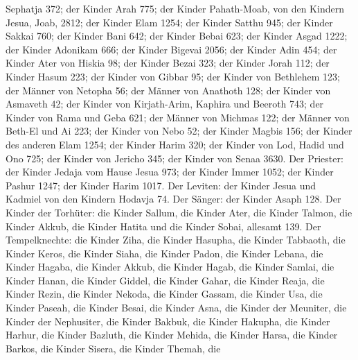 Sephatja 372;  der Kinder Arah 775;  der Kinder
Pahath-Moab, von den Kindern Jesua, Joab, 2812;  der Kinder
Elam 1254;  der Kinder Satthu 945;  der Kinder
Sakkai 760;  der Kinder Bani 642;  der Kinder
Bebai 623;  der Kinder Asgad 1222;  der Kinder
Adonikam 666;  der Kinder Bigevai 2056;  der
Kinder Adin 454;  der Kinder Ater von Hiskia 98;
 der Kinder Bezai 323;  der Kinder Jorah 112;
 der Kinder Hasum 223;  der Kinder von Gibbar
95;  der Kinder von Bethlehem 123;  der Männer
von Netopha 56;  der Männer von Anathoth 128; 
der Kinder von Asmaveth 42;  der Kinder von Kirjath-Arim,
Kaphira und Beeroth 743;  der Kinder von Rama und Geba 621;
 der Männer von Michmas 122;  der Männer von
Beth-El und Ai 223;  der Kinder von Nebo 52; 
der Kinder Magbis 156;  der Kinder des anderen Elam 1254;
 der Kinder Harim 320;  der Kinder von Lod,
Hadid und Ono 725;  der Kinder von Jericho 345;
 der Kinder von Senaa 3630.  Der Priester: der
Kinder Jedaja vom Hause Jesua 973;  der Kinder Immer 1052;
 der Kinder Pashur 1247;  der Kinder Harim
1017.  Der Leviten: der Kinder Jesua und Kadmiel von den
Kindern Hodavja 74.  Der Sänger: der Kinder Asaph 128.
 Der Kinder der Torhüter: die Kinder Sallum, die Kinder
Ater, die Kinder Talmon, die Kinder Akkub, die Kinder Hatita und die
Kinder Sobai, allesamt 139.  Der Tempelknechte: die Kinder
Ziha, die Kinder Hasupha, die Kinder Tabbaoth,  die Kinder
Keros, die Kinder Siaha, die Kinder Padon,  die Kinder
Lebana, die Kinder Hagaba, die Kinder Akkub,  die Kinder
Hagab, die Kinder Samlai, die Kinder Hanan,  die Kinder
Giddel, die Kinder Gahar, die Kinder Reaja,  die Kinder
Rezin, die Kinder Nekoda, die Kinder Gassam,  die Kinder
Usa, die Kinder Paseah, die Kinder Besai,  die Kinder Asna,
die Kinder der Meuniter, die Kinder der Nephusiter,  die
Kinder Bakbuk, die Kinder Hakupha, die Kinder Harhur,  die
Kinder Bazluth, die Kinder Mehida, die Kinder Harsa,  die
Kinder Barkos, die Kinder Sisera, die Kinder Themah,  die
